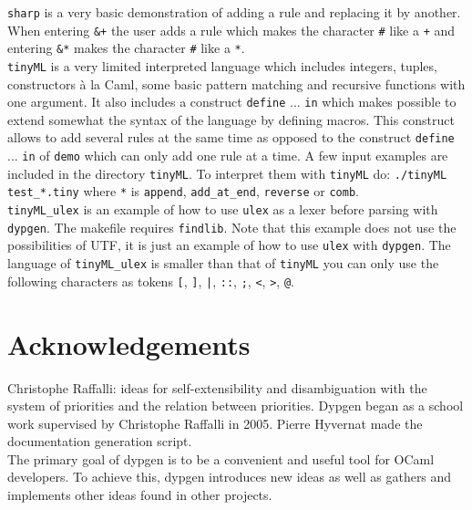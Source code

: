 \documentclass[12pt]{article}
\begin{document}
{\verb|sharp| is a very basic demonstration of adding a rule and replacing it by another. When entering \verb|&+| the user adds a rule which makes the character \verb|#| like a \verb|+| and entering \verb|&*| makes the character \verb|#| like a \verb|*|.\\

\verb|tinyML| is a very limited interpreted language which includes integers, tuples, constructors \`a la Caml, some basic pattern matching and recursive functions with one argument. It also includes a construct \verb|define| ... \verb|in| which makes possible to extend somewhat the syntax of the language by defining macros. This construct allows to add several rules at the same time as opposed to the construct \verb|define| ... \verb|in| of \verb|demo| which can only add one rule at a time. A few input examples are included in the directory \verb|tinyML|. To interpret them with \verb|tinyML| do: \verb|./tinyML test_*.tiny| where \verb|*| is \verb|append|, \verb|add_at_end|, \verb|reverse| or \verb|comb|.\\

\verb|tinyML_ulex| is an example of how to use \verb|ulex| as a lexer before parsing with \verb|dypgen|. The makefile requires \verb|findlib|. Note that this example does not use the possibilities of UTF, it is just an example of how to use \verb|ulex| with \verb|dypgen|. The language of \verb|tinyML_ulex| is smaller than that of \verb|tinyML| you can only use the following characters as tokens \verb|[|, \verb|]|, \verb$|$, \verb|::|, \verb|;|, \verb|<|, \verb|>|, \verb|@|.\\

\appendix

\section{Acknowledgements}

Christophe Raffalli: ideas for self-extensibility and disambiguation with the system of priorities and the relation between priorities. Dypgen began as a school work supervised by Christophe Raffalli in 2005. Pierre Hyvernat made the documentation generation script.\\

The primary goal of dypgen is to be a convenient and useful tool for OCaml developers. To achieve this, dypgen introduces new ideas as well as gathers and implements other ideas found in other projects.\\

}
\end{document}
